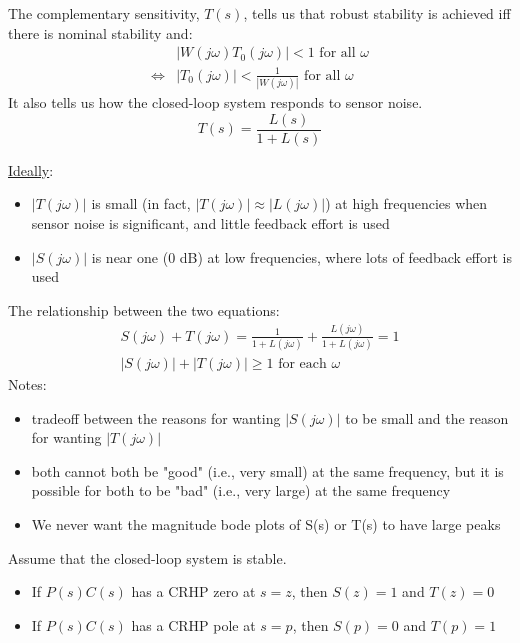 \documentclass[12pt]{article}
\begin{document}
\begin{multicols*}{2}
    The complementary sensitivity, \( T(s) \), tells us that robust stability is achieved iff there is nominal stability and:
    \[
        \begin{aligned}
                            & | W(j\omega) T_0(j\omega) | < 1 \text{ for all } \omega               \\
            \Leftrightarrow & | T_0(j\omega) | < \frac{ 1 }{ |W(j\omega)| } \text{ for all } \omega
        \end{aligned}
    \]
    It also tells us how the closed-loop system responds to sensor noise.
    \[T(s) = \frac{ L(s) }{ 1 + L(s) } \]

    \underline{Ideally}:
    \begin{itemize}
        \item \( |T(j\omega)| \) is small (in fact, \( |T(j\omega)| \approx |L(j\omega)| \)) at high frequencies when sensor noise is significant, and little feedback effort is used
        \item \( |S(j\omega)| \) is near one (0 dB) at low frequencies, where lots of feedback effort is used
    \end{itemize}

    The relationship between the two equations:
    \begin{gather}
        S(j\omega) + T(j\omega) = \frac{ 1 }{ 1 + L(j\omega) } + \frac{ L(j\omega) }{ 1 + L(j\omega) } = 1 \\
        | S(j\omega) | + | T(j\omega) | \geq 1 \text{ for each } \omega
    \end{gather}
    Notes:
    \begin{itemize}
        \item tradeoff between the reasons for wanting \( | S(j\omega) | \) to be small and the reason for wanting \( | T(j\omega) | \)
        \item both cannot both be "good" (i.e., very small) at the same frequency, but it is possible for both to be "bad" (i.e., very large) at the same frequency
        \item We never want the magnitude bode plots of S(s) or T(s) to have large peaks
    \end{itemize}

    \underline{}
    Assume that the closed-loop system is stable.
    \begin{itemize}
        \item If \( P(s)C(s) \) has a CRHP zero at \( s = z \), then \( S(z) = 1 \) and \( T(z) = 0 \)
        \item If \( P(s)C(s) \) has a CRHP pole at \( s = p \), then \( S(p) = 0 \) and \( T(p) = 1 \)
    \end{itemize}


\end{multicols*}
\end{document}
